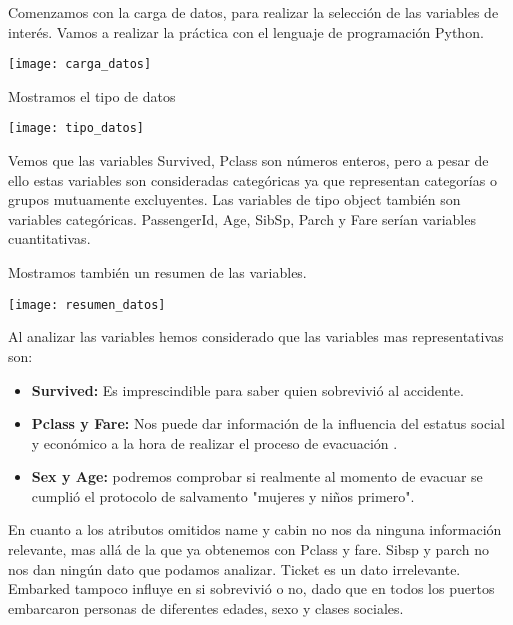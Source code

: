 \documentclass[12pt]{article}
\providecommand{\tightlist}{%
  \setlength{\itemsep}{0pt}\setlength{\parskip}{0pt}}
\begin{document}
Comenzamos con la carga de datos, para realizar la selección de las variables de interés. Vamos a realizar la práctica con el lenguaje de programación Python.

\label{imagen}
  	\begin{center}
  	\texttt{[image: carga\_datos]}
\end{center}

Mostramos el tipo de datos

\label{imagen}
  	\begin{center}
  	\texttt{[image: tipo\_datos]}
\end{center}

Vemos que las variables Survived, Pclass son números enteros, pero a pesar de ello estas variables son consideradas categóricas ya que representan categorías o grupos mutuamente excluyentes. Las variables de tipo object también son variables categóricas. PassengerId, Age, SibSp, Parch y Fare serían variables cuantitativas.

Mostramos también un resumen de las variables.

\label{imagen}
  	\begin{center}
  	\texttt{[image: resumen\_datos]}
\end{center}

Al analizar las variables hemos considerado que las variables mas representativas son:

\begin{itemize}
\tightlist
\item
  \textbf{Survived:} Es imprescindible para saber quien sobrevivió al accidente.\\
\item
  \textbf{Pclass y Fare:} Nos puede dar información de la influencia del estatus social y económico a la hora de realizar el proceso de evacuación .\\ 
\item
  \textbf{Sex y Age:} podremos comprobar si realmente al momento de evacuar se cumplió el protocolo de salvamento "mujeres y niños primero".\\
\end{itemize}
En cuanto a los atributos omitidos name y cabin no nos da ninguna información relevante, mas allá de la que ya obtenemos con Pclass y fare. Sibsp y parch no nos dan ningún dato que podamos analizar. Ticket es un dato irrelevante. Embarked tampoco influye en si sobrevivió o no, dado que en todos los puertos embarcaron personas de diferentes edades, sexo y clases sociales.
\end{document}
